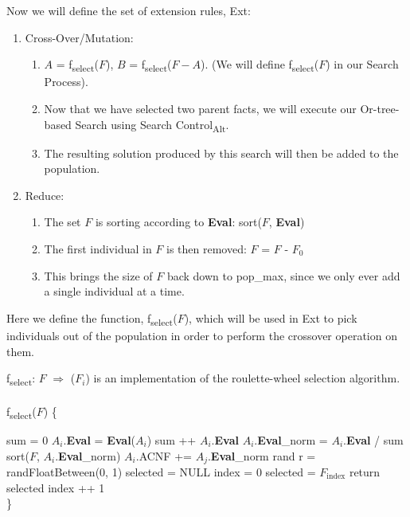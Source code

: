 \documentclass[11pt, oneside]{article}   	%
\begin{document}
\noindent Now we will define the set of extension rules, Ext:
\begin{enumerate} [topsep=0pt, itemsep=0pt, leftmargin=*]
\item Cross-Over/Mutation:
	\begin{enumerate}[leftmargin=*]
	\item $A$ = f\textsubscript{select}($F$), $B$ = f\textsubscript{select}($F - A$). (We will define f\textsubscript{select}($F$) in our Search Process).
	\item Now that we have selected two parent facts, we will execute our Or-tree-based Search using Search Control\textsubscript{Alt}.
	\item The resulting solution produced by this search will then be added to the population.
	\end{enumerate} 
\item Reduce:
	\begin{enumerate}
	\item The set $F$ is sorting according to \textbf{Eval}: sort($F$, \textbf{Eval})
	\item The first individual in $F$ is then removed: $F$ = $F$ - $F_0$
	\item This brings the size of $F$ back down to pop_max, since we only ever add a single individual at a time.
	\end{enumerate}
\end{enumerate}


\noindent Here we define the function, f\textsubscript{select}($F$), which will be used in Ext to pick individuals out of the population in order to perform the crossover operation on them.

\noindent f\textsubscript{select}: $F$ $\Rightarrow$ ($F_i$) is an implementation of the roulette-wheel selection algorithm.\\\\
f\textsubscript{select}($F$) \{
\begin{algorithmic}[\textfloatsep = 0pt]
    \STATE sum = 0
    	\STATE $A_i$.\textbf{Eval} = \textbf{Eval}($A_i$)
	\STATE sum ++ $A_i$.\textbf{Eval}
    \ENDFOR
    	\STATE $A_i$.\textbf{Eval}_norm = $A_i$.\textbf{Eval} / sum
    \ENDFOR
    \STATE sort($F$, $A_i$.\textbf{Eval}_norm)
    		\STATE $A_i$.ACNF += $A_j$.\textbf{Eval}_norm
    	\ENDFOR
    \ENDFOR
    \STATE rand r = randFloatBetween(0, 1)
    \STATE selected = NULL
    \STATE index = 0
    	\STATE selected = $F_{\text{index}}$
    		\STATE return selected
    	\ENDIF
	\STATE index ++ 1
    \ENDWHILE \\ \}
\end{algorithmic}
      
\end{document}
